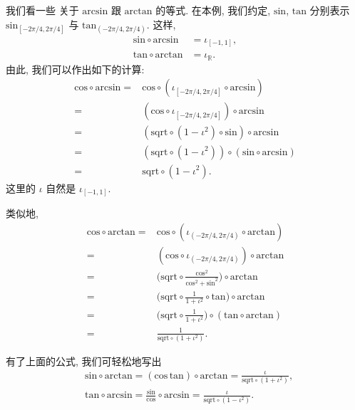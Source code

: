 \begin{example}
    我们看一些%
    关于 $\mathrm{arcsin}$ 跟 $\mathrm{arctan}$ 的等式.
    在本例, 我们约定,
    $\mathrm{sin}$, $\mathrm{tan}$ 分别表示
    $\mathrm{sin}_{[-2\pi/4, 2\pi/4]}$
    与
    $\mathrm{tan}_{(-2\pi/4, 2\pi/4)}$.
    这样,
    \begin{align*}
        \mathrm{sin} \circ \mathrm{arcsin}
         & = \iota_{[-1, 1]},    \\
        \mathrm{tan} \circ \mathrm{arctan}
         & = \iota_{\mathbb{R}}.
    \end{align*}
    由此, 我们可以作出如下的计算:
    \begin{align*}
        \mathrm{cos} \circ \mathrm{arcsin}
        = {} & \mathrm{cos} \circ (\iota_{[-2\pi/4, 2\pi/4]} \circ \mathrm{arcsin})           \\
        = {} & (\mathrm{cos} \circ \iota_{[-2\pi/4, 2\pi/4]}) \circ \mathrm{arcsin}           \\
        = {} & (\mathrm{sqrt} \circ (1 - \iota^2) \circ \mathrm{sin}) \circ \mathrm{arcsin}   \\
        = {} & (\mathrm{sqrt} \circ (1 - \iota^2)) \circ (\mathrm{sin} \circ \mathrm{arcsin}) \\
        = {} & \mathrm{sqrt} \circ (1 - \iota^2).
    \end{align*}
    这里的 $\iota$ 自然是 $\iota_{[-1, 1]}$.

    类似地,
    \begin{align*}
        \mathrm{cos} \circ \mathrm{arctan}
        = {} & \mathrm{cos} \circ (\iota_{(-2\pi/4, 2\pi/4)} \circ \mathrm{arctan})                                           \\
        = {} & (\mathrm{cos} \circ \iota_{(-2\pi/4, 2\pi/4)}) \circ \mathrm{arctan}                                           \\
        = {} & \bigg( \mathrm{sqrt} \circ \frac{\mathrm{cos}^2} {\mathrm{cos}^2 + \mathrm{sin}^2}\bigg) \circ \mathrm{arctan} \\
        = {} & \bigg( \mathrm{sqrt} \circ \frac{1}{1 + \iota^2} \circ \mathrm{tan} \bigg) \circ \mathrm{arctan}               \\
        = {} & \bigg( \mathrm{sqrt} \circ \frac{1}{1 + \iota^2} \bigg) \circ (\mathrm{tan} \circ \mathrm{arctan})             \\
        = {} & \frac{1}{\mathrm{sqrt} \circ (1 + \iota^2)}.
    \end{align*}

    有了上面的公式, 我们可轻松地写出
    \begin{align*}
         & \mathrm{sin} \circ \mathrm{arctan}
        = (\mathrm{cos} \, \mathrm{tan}) \circ \mathrm{arctan}
        = \frac{\iota}{\mathrm{sqrt} \circ (1 + \iota^2)}, \\
         & \mathrm{tan} \circ \mathrm{arcsin}
        = \frac{\mathrm{sin}}{\mathrm{cos}} \circ \mathrm{arcsin}
        = \frac{\iota}{\mathrm{sqrt} \circ (1 - \iota^2)}.
    \end{align*}
\end{example}

